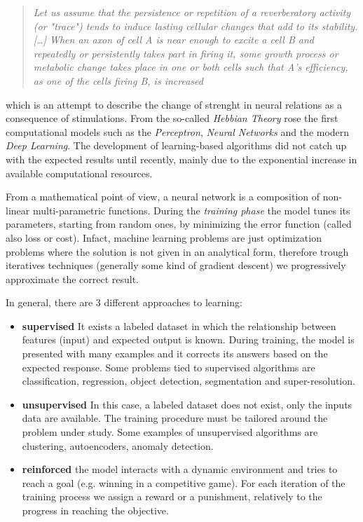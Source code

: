 \documentclass[12pt,a4paper]{report}
\begin{document}
\begin{quote}
 \begin{center}
  \textit{Let us assume that the persistence or repetition of a reverberatory activity (or "trace") tends to induce lasting cellular changes that add to its stability.[…] When an axon of cell A is near enough to excite a cell B and repeatedly or persistently takes part in firing it, some growth process or metabolic change takes place in one or both cells such that A's efficiency, as one of the cells firing B, is increased}
 \end{center}
\end{quote}

which is an attempt to describe the change of strenght in neural relations as a consequence of stimulations.
From the so-called \textit{Hebbian Theory} rose the first computational models such as the \textit{Perceptron}, \textit{Neural Networks} and the modern \textit{Deep Learning}. 
The development of learning-based algorithms did not catch up with the expected results until recently, mainly due to the exponential increase in available computational resources.

From a mathematical point of view, a neural network is a composition of non-linear multi-parametric functions. 
During the {\it training phase} the model tunes its parameters, starting from random ones, by minimizing the error function (called also loss or cost). 
Infact, machine learning problems are just optimization problems where the solution is not given in an analytical form, therefore trough iteratives techniques (generally some kind of gradient descent) we progressively approximate the correct result.

In general, there are 3 different approaches to learning:

\begin{itemize}
 \item {\bf supervised} It exists a labeled dataset in which the relationship between features (input) and expected output is known. 
 During training, the model is presented with many examples and it corrects its answers based on the expected response.  
 Some problems tied to supervised algorithms are classification, regression, object detection, segmentation and super-resolution.
 \item {\bf unsupervised} In this case, a labeled dataset does not exist, only the inputs data are available. 
 The training procedure must be tailored around the problem under study. Some examples of unsupervised algorithms are clustering, autoencoders, anomaly detection.
 \item {\bf reinforced} the model interacts with a dynamic environment and tries to reach a goal (e.g. winning in a competitive game). 
 For each iteration of the training process we assign a reward or a punishment, relatively to the progress in reaching the objective.
\end{itemize}
\end{document}
